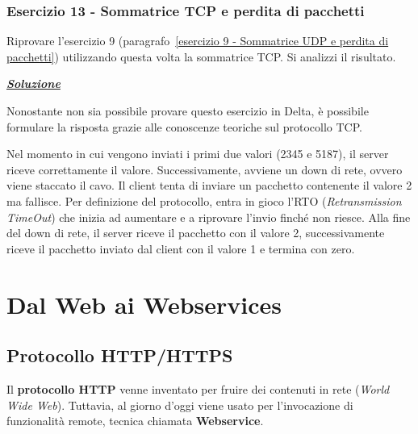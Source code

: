\documentclass[a4paper]{article}
\begin{document}
	\subsubsection{Esercizio 13 - Sommatrice TCP e perdita di pacchetti}
	
	Riprovare l'esercizio 9 (paragrafo~\ref{esercizio 9 - Sommatrice UDP e perdita di pacchetti}) utilizzando questa volta la sommatrice TCP. Si analizzi il risultato.\newline
	
	\noindent
	\textcolor{Green4}{\textbf{\emph{\underline{Soluzione}}}}\newline
	
	\noindent
	Nonostante non sia possibile provare questo esercizio in Delta, è possibile formulare la risposta grazie alle conoscenze teoriche sul protocollo TCP.\newline
	
	\noindent
	Nel momento in cui vengono inviati i primi due valori (2345 e 5187), il server riceve correttamente il valore. Successivamente, avviene un down di rete, ovvero viene staccato il cavo. Il client tenta di inviare un pacchetto contenente il valore 2 ma fallisce. Per definizione del protocollo, entra in gioco l'RTO (\emph{Retransmission TimeOut}) che inizia ad aumentare e a riprovare l'invio finché non riesce. Alla fine del down di rete, il server riceve il pacchetto con il valore 2, successivamente riceve il pacchetto inviato dal client con il valore 1 e termina con zero.










	
	\newpage

	\section{Dal Web ai Webservices}
	
	\subsection{Protocollo HTTP/HTTPS}
	
	Il \textcolor{Red3}{\textbf{protocollo HTTP}} venne inventato per fruire dei contenuti in rete (\emph{World Wide Web}). Tuttavia, al giorno d'oggi viene usato per l'invocazione di funzionalità remote, tecnica chiamata \textbf{Webservice}.\newline
	
\end{document}
